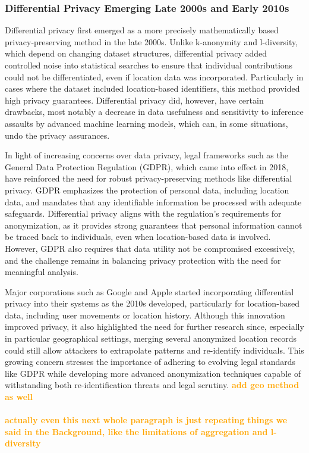 \documentclass[twocolumn]{article}
\newcommand{\later}[1]{\textbf{\textcolor{orange}{#1}}}
\begin{document}
\subsubsection{Differential Privacy Emerging Late 2000s and Early 2010s}

Differential privacy first emerged as a more precisely mathematically based privacy-preserving method in the late 2000s. Unlike k-anonymity and l-diversity, which depend on changing dataset structures, differential privacy added controlled noise into statistical searches to ensure that individual contributions could not be differentiated, even if location data was incorporated. Particularly in cases where the dataset included location-based identifiers, this method provided high privacy guarantees. Differential privacy did, however, have certain drawbacks, most notably a decrease in data usefulness and sensitivity to inference assaults by advanced machine learning models, which can, in some situations, undo the privacy assurances.

In light of increasing concerns over data privacy, legal frameworks such as the General Data Protection Regulation (GDPR), which came into effect in 2018, have reinforced the need for robust privacy-preserving methods like differential privacy. GDPR emphasizes the protection of personal data, including location data, and mandates that any identifiable information be processed with adequate safeguards. Differential privacy aligns with the regulation's requirements for anonymization, as it provides strong guarantees that personal information cannot be traced back to individuals, even when location-based data is involved. However, GDPR also requires that data utility not be compromised excessively, and the challenge remains in balancing privacy protection with the need for meaningful analysis.

Major corporations such as Google and Apple started incorporating differential privacy into their systems as the 2010s developed, particularly for location-based data, including user movements or location history. Although this innovation improved privacy, it also highlighted the need for further research since, especially in particular geographical settings, merging several anonymized location records could still allow attackers to extrapolate patterns and re-identify individuals. This growing concern stresses the importance of adhering to evolving legal standards like GDPR while developing more advanced anonymization techniques capable of withstanding both re-identification threats and legal scrutiny.
\later{add geo method as well}
\\ \\
\later{actually even this next whole paragraph is just repeating things we said in the Background, like the limitations of aggregation and l-diversity}
\end{document}
